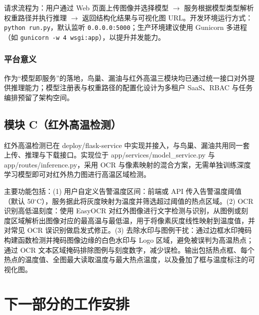 \documentclass[12pt,a4paper]{article}
\begin{document}
请求流程为：用户通过 Web 页面上传图像并选择模型 $\rightarrow$ 服务根据模型类型解析权重路径并执行推理 $\rightarrow$ 返回结构化结果与可视化图 URL。开发环境运行方式：\texttt{python run.py}，默认监听 \texttt{0.0.0.0:5000}；生产环境建议使用 Gunicorn 多进程（如 \texttt{gunicorn -w 4 wsgi:app}），以提升并发能力。

\subsubsection{平台意义}

作为“模型即服务”的落地，鸟巢、漏油与红外高温三模块均已通过统一接口对外提供推理能力；模型注册表与权重路径的配置化设计为多租户 SaaS、RBAC 与任务编排预留了架构空间。

\subsection{模块 C（红外高温检测）}

红外高温检测已在 deploy/flask-service 中实现并接入，与鸟巢、漏油共用同一套上传、推理与下载接口。实现位于 app/services/model\_service.py 与 app/routes/inference.py，采用 OCR 与像素映射的混合方案，无需单独训练深度学习模型即可对红外热力图进行高温区域检测。

主要功能包括：(1) 用户自定义告警温度区间：前端或 API 传入告警温度阈值（默认 50$^\circ$C），服务据此将灰度映射为温度并筛选超过阈值的热点区域。(2) OCR 识别高低温刻度：使用 EasyOCR 对红外图像进行文字检测与识别，从图例或刻度区域解析出图像对应的最高温与最低温，用于将像素灰度线性映射到温度值，并对常见 OCR 误识别做启发式修正。(3) 去除水印与图例干扰：通过边框水印掩码构建函数检测并掩码图像边缘的白色水印与 Logo 区域，避免被误判为高温热点；通过 OCR 文本区域掩码排除图例与刻度数字，减少误检。输出包括热点框、每个热点的温度值、全图最大读取温度与最大热点温度，以及叠加了框与温度标注的可视化图。


\section{下一部分的工作安排}
\end{document}
